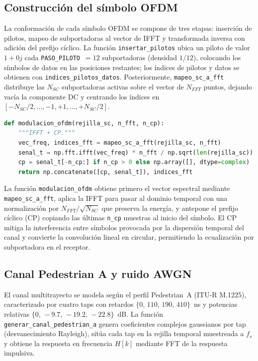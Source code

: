 \documentclass[conference,onecolumn]{IEEEtran}
\begin{document}
\subsection{Construcci\'on del s\'imbolo OFDM}

La conformaci\'on de cada s\'imbolo OFDM se compone de tres etapas: inserci\'on de pilotos, mapeo de subportadoras al vector de IFFT y transformada inversa con adici\'on del prefijo c\'iclico. La funci\'on \texttt{insertar\_pilotos} ubica un piloto de valor $1+0j$ cada \texttt{PASO\_PILOTO}~$=12$ subportadoras (densidad $1/12$), colocando los s\'imbolos de datos en las posiciones restantes; los \'indices de pilotos y datos se obtienen con \texttt{indices\_pilotos\_datos}. Posteriormente, \texttt{mapeo\_sc\_a\_fft} distribuye las $N_{SC}$ subportadoras activas sobre el vector de $N_{FFT}$ puntos, dejando vac\'ia la componente DC y centrando los \'indices en $[-N_{SC}/2,\dots,-1,+1,\dots,+N_{SC}/2]$.

\begin{lstlisting}[language=Python]
def modulacion_ofdm(rejilla_sc, n_fft, n_cp):
    """IFFT + CP."""
    vec_freq, indices_fft = mapeo_sc_a_fft(rejilla_sc, n_fft)
    senal_t = np.fft.ifft(vec_freq) * n_fft / np.sqrt(len(rejilla_sc))
    cp = senal_t[-n_cp:] if n_cp > 0 else np.array([], dtype=complex)
    return np.concatenate([cp, senal_t]), indices_fft
\end{lstlisting}

La funci\'on \texttt{modulacion\_ofdm} obtiene primero el vector espectral mediante \texttt{mapeo\_sc\_a\_fft}, aplica la IFFT para pasar al dominio temporal con una normalizaci\'on por $N_{FFT}/\sqrt{N_{SC}}$ que preserva la energ\'ia, y antepone el prefijo c\'iclico (CP) copiando las \'ultimas \texttt{n\_cp} muestras al inicio del s\'imbolo. El CP mitiga la interferencia entre s\'imbolos provocada por la dispersi\'on temporal del canal y convierte la convoluci\'on lineal en circular, permitiendo la ecualizaci\'on por subportadora en el receptor.

\subsection{Canal Pedestrian A y ruido AWGN}

El canal multitrayecto se modela seg\'un el perfil Pedestrian~A (ITU-R M.1225), caracterizado por cuatro taps con retardos $\{0,\,110,\,190,\,410\}$~ns y potencias relativas $\{0,\,-9.7,\,-19.2,\,-22.8\}$~dB. La funci\'on \texttt{generar\_canal\_pedestrian\_a} genera coeficientes complejos gaussianos por tap (desvanecimiento Rayleigh), sit\'ua cada tap en la rejilla temporal muestreada a $f_s$ y obtiene la respuesta en frecuencia $H[k]$ mediante FFT de la respuesta impulsiva.
\end{document}
